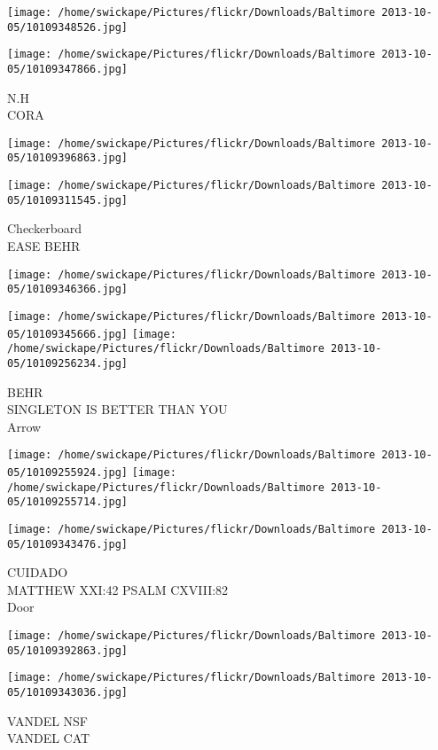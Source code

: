 \documentclass[10pt,letterpaper]{article}
\begin{document}
\texttt{[image: /home/swickape/Pictures/flickr/Downloads/Baltimore 2013-10-05/10109348526.jpg]}

\vspace{0.25in}
\texttt{[image: /home/swickape/Pictures/flickr/Downloads/Baltimore 2013-10-05/10109347866.jpg]}

N.H\\
CORA
\pagebreak

\texttt{[image: /home/swickape/Pictures/flickr/Downloads/Baltimore 2013-10-05/10109396863.jpg]}

\vspace{0.25in}
\texttt{[image: /home/swickape/Pictures/flickr/Downloads/Baltimore 2013-10-05/10109311545.jpg]}

Checkerboard\\
EASE BEHR
\pagebreak

\texttt{[image: /home/swickape/Pictures/flickr/Downloads/Baltimore 2013-10-05/10109346366.jpg]}

\vspace{0.25in}
\texttt{[image: /home/swickape/Pictures/flickr/Downloads/Baltimore 2013-10-05/10109345666.jpg]}
\texttt{[image: /home/swickape/Pictures/flickr/Downloads/Baltimore 2013-10-05/10109256234.jpg]}

BEHR\\
SINGLETON IS BETTER THAN YOU\\
Arrow
\pagebreak

\texttt{[image: /home/swickape/Pictures/flickr/Downloads/Baltimore 2013-10-05/10109255924.jpg]}
\texttt{[image: /home/swickape/Pictures/flickr/Downloads/Baltimore 2013-10-05/10109255714.jpg]}

\texttt{[image: /home/swickape/Pictures/flickr/Downloads/Baltimore 2013-10-05/10109343476.jpg]}

CUIDADO\\
MATTHEW XXI:42 PSALM CXVIII:82\\
Door
\pagebreak

\texttt{[image: /home/swickape/Pictures/flickr/Downloads/Baltimore 2013-10-05/10109392863.jpg]}

\vspace{0.25in}
\texttt{[image: /home/swickape/Pictures/flickr/Downloads/Baltimore 2013-10-05/10109343036.jpg]}

VANDEL NSF\\
VANDEL CAT
\pagebreak
\end{document}
